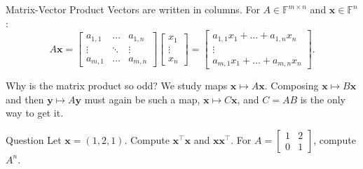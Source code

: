 \documentclass{zkdl-presentation-template}
\begin{document}
    \begin{frame}{Matrix-Vector Product}
        Vectors are written in columns. For $A \in \mathbb{F}^{m \times n}$ and $\mathbf{x} \in \mathbb{F}^n$:
        \begin{equation*}
            A\mathbf{x} = \begin{bmatrix}
                a_{1,1} & \dots & a_{1,n} \\
                \vdots & \ddots & \vdots \\
                a_{m,1} & \dots & a_{m,n}
            \end{bmatrix}\begin{bmatrix}
                x_1 \\ \vdots \\ x_n
            \end{bmatrix} = \begin{bmatrix}
                a_{1,1}x_1 + \dots + a_{1,n}x_n \\
                \vdots \\
                a_{m,1}x_1 + \dots + a_{m,n}x_n
            \end{bmatrix}.
        \end{equation*}
        \pause

        \begin{remark}
            Why is the matrix product so odd? We study maps $\mathbf{x} \mapsto A\mathbf{x}$. Composing $\mathbf{x} \mapsto B\mathbf{x}$ and then $\mathbf{y} \mapsto A\mathbf{y}$ must again be such a map, $\mathbf{x} \mapsto C\mathbf{x}$, and $C = AB$ is the only way to get it.
        \end{remark}
        \pause

        \begin{questionblock}{Question}
            Let $\mathbf{x} = (1,2,1)$. Compute $\mathbf{x}^{\top}\mathbf{x}$ and $\mathbf{x}\mathbf{x}^{\top}$. For $A = \begin{bmatrix} 1 & 2 \\ 0 & 1 \end{bmatrix}$, compute $A^n$.
        \end{questionblock}
    \end{frame}
\end{document}
